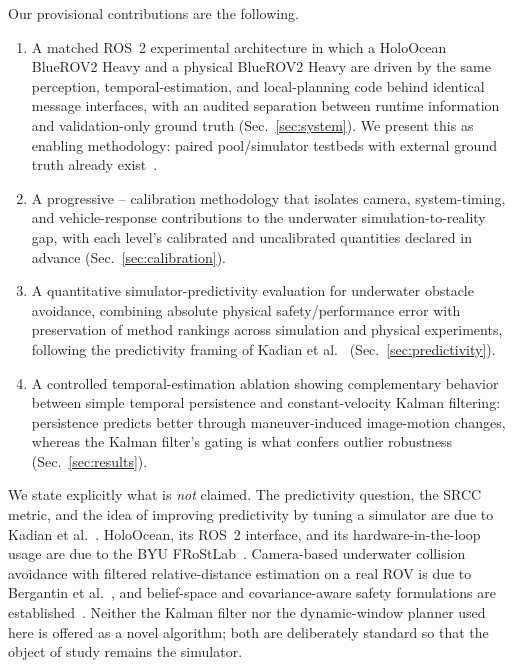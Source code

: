 Our provisional contributions are the following.
\begin{enumerate}
  \item A matched ROS~2 experimental architecture in which a HoloOcean
    BlueROV2 Heavy and a physical BlueROV2 Heavy are driven by the same
    perception, temporal-estimation, and local-planning code behind identical
    message interfaces, with an audited separation between runtime
    information and validation-only ground truth
    (Sec.~\ref{sec:system}). We present this as enabling methodology: paired
    pool/simulator testbeds with external ground truth already
    exist~\cite{yang2025duvindif,alineipoiana2024abluerov,meyers2025testinga}.
  \item A progressive \SZERO--\STHREE{} calibration methodology that isolates
    camera, system-timing, and vehicle-response contributions to the
    underwater simulation-to-reality gap, with each level's calibrated and
    uncalibrated quantities declared in advance
    (Sec.~\ref{sec:calibration}).
  \item A quantitative simulator-predictivity evaluation for underwater
    obstacle avoidance, combining absolute physical safety/performance error
    with preservation of method rankings across simulation and physical
    experiments, following the predictivity framing of
    Kadian et al.~\cite{kadian2020simrealp}
    (Sec.~\ref{sec:predictivity}).
  \item A controlled temporal-estimation ablation showing complementary
    behavior between simple temporal persistence and constant-velocity Kalman
    filtering: persistence predicts better through maneuver-induced
    image-motion changes, whereas the Kalman filter's gating is what confers
    outlier robustness (Sec.~\ref{sec:results}).
\end{enumerate}

We state explicitly what is \emph{not} claimed. The predictivity question,
the SRCC metric, and the idea of improving predictivity by tuning a simulator
are due to Kadian et al.~\cite{kadian2020simrealp}. HoloOcean, its ROS~2
interface, and its hardware-in-the-loop usage are due to the BYU
FRoStLab~\cite{potokar2022holoocea,potokar2024holoocea,meyers2025testinga}.
Camera-based underwater collision avoidance with filtered relative-distance
estimation on a real ROV is due to Bergantin et
al.~\cite{bergantin2024realtime}, and belief-space and
covariance-aware safety formulations are
established~\cite{han2025riskaware,han2026riskawar,li2024anobstac}. Neither
the Kalman filter nor the dynamic-window planner used here is offered as a
novel algorithm; both are deliberately standard so that the object of study
remains the simulator.
